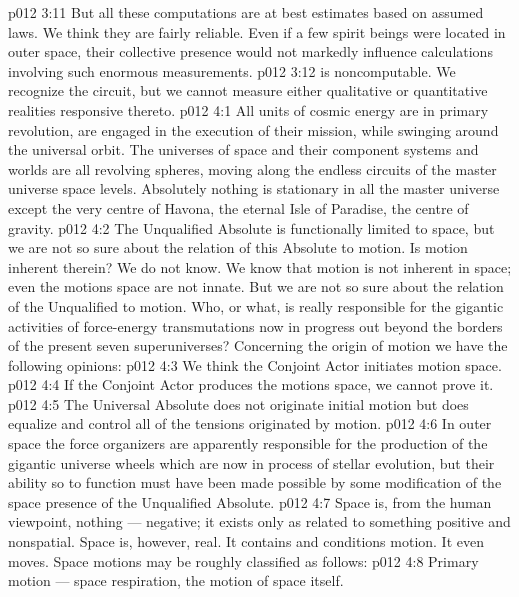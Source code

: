 \vs p012 3:11 But all these computations are at best estimates based on assumed laws. We think they are fairly reliable. Even if a few spirit beings were located in outer space, their collective presence would not markedly influence calculations involving such enormous measurements.
\vs p012 3:12 \pc {} is noncomputable. We recognize the circuit, but we cannot measure either qualitative or quantitative realities responsive thereto.
\vs p012 4:1 All units of cosmic energy are in primary revolution, are engaged in the execution of their mission, while swinging around the universal orbit. The universes of space and their component systems and worlds are all revolving spheres, moving along the endless circuits of the master universe space levels. Absolutely nothing is stationary in all the master universe except the very centre of Havona, the eternal Isle of Paradise, the centre of gravity.
\vs p012 4:2 The Unqualified Absolute is functionally limited to space, but we are not so sure about the relation of this Absolute to motion. Is motion inherent therein? We do not know. We know that motion is not inherent in space; even the motions  space are not innate. But we are not so sure about the relation of the Unqualified to motion. Who, or what, is really responsible for the gigantic activities of force\hyp{}energy transmutations now in progress out beyond the borders of the present seven superuniverses? Concerning the origin of motion we have the following opinions:
\vs p012 4:3 \bibnobreakspace We think the Conjoint Actor initiates motion  space.
\vs p012 4:4 \bibnobreakspace If the Conjoint Actor produces the motions  space, we cannot prove it.
\vs p012 4:5 \bibnobreakspace The Universal Absolute does not originate initial motion but does equalize and control all of the tensions originated by motion.
\vs p012 4:6 \pc In outer space the force organizers are apparently responsible for the production of the gigantic universe wheels which are now in process of stellar evolution, but their ability so to function must have been made possible by some modification of the space presence of the Unqualified Absolute.
\vs p012 4:7 \pc Space is, from the human viewpoint, nothing --- negative; it exists only as related to something positive and nonspatial. Space is, however, real. It contains and conditions motion. It even moves. Space motions may be roughly classified as follows:
\vs p012 4:8 \bibnobreakspace Primary motion --- space respiration, the motion of space itself.
